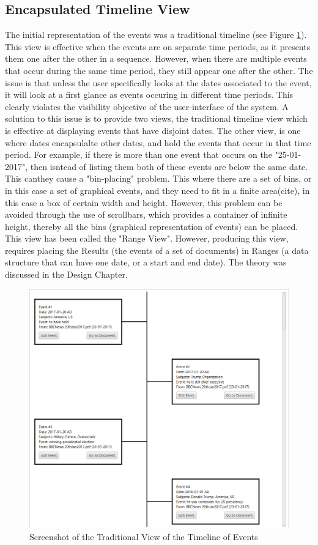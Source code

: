\subsection{Encapsulated Timeline View}
\par The initial representation of the events was a traditional timeline (see Figure \ref{fig:traditionalView}). This view is effective when the events are on separate time periods, as it presents them one after the other in a sequence. However, when there are multiple events that occur during the same time period, they still appear one after the other. The issue is that unless the user specifically looks at the dates associated to the event, it will look at a first glance as events occuring in different time periods. This clearly violates the visibility objective of the user-interface of the system. A solution to this issue is to provide two views, the traditional timeline view which is effective at displaying events that have disjoint dates. The other view, is one where dates encapsulalte other dates, and hold the events that occur in that time period. For example, if there is more than one event that occurs on the "25-01-2017", then isntead of listing them both of these events are below the same date. This canthey cause a "bin-placing" problem. This where there are a set of bins, or in this case a set of graphical events, and they need to fit in a finite area(cite), in this case a box of certain width and height. However, this problem can be avoided through the use of scrollbars, which provides a container of infinite height, thereby all the bins (graphical representation of events) can be placed. This view has been called the "Range View". However, producing this view, requires placing the Results (the events of a set of documents) in Ranges (a data structure that can have one date, or a start and end date). The theory was discussed in the Design Chapter.
\begin{figure}[H]
\caption{Screenshot of the Traditional View of the Timeline of Events}
\label{fig:traditionalView}
\includegraphics[width=\linewidth]{traditionalView.png}
\centering
\end{figure}
